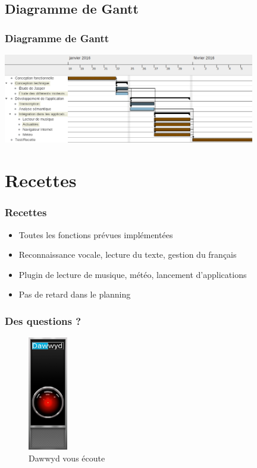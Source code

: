 \documentclass{beamer}
\begin{document}
\subsection{Diagramme de Gantt}

\begin{frame}
\frametitle{Diagramme de Gantt}
	\includegraphics[width=11cm]{gantt}
\end{frame}


\section{Recettes}

\begin{frame}
\frametitle{Recettes}
\begin{itemize}
    \setlength\itemsep{2em}
    \item Toutes les fonctions prévues implémentées
    \item Reconnaissance vocale, lecture du texte, gestion du français
    \item Plugin de lecture de musique, météo, lancement d'applications
    \item Pas de retard dans le planning
\end{itemize}
\end{frame}

\begin{frame}
\frametitle{Des questions ?}
\centering
\begin{figure}
    \includegraphics[height=5cm]{hal_dawwyd}
    \caption{Dawwyd vous écoute}
\end{figure}
\end{frame}
\end{document}
